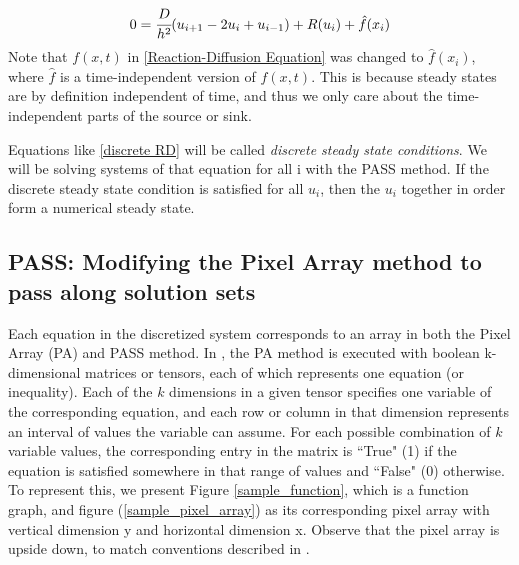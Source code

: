 \documentclass[11pt]{article}
\begin{document}
\begin{equation}
    \label{discrete RD}
    0 = \cfrac{D}{h^2} (u_{i+1} - 2u_i + u_{i-1}) + R(u_i) + \hat{f}(x_i)
\end{equation}
Note that $f(x,t)$ in \cref{Reaction-Diffusion Equation} was changed to $\hat{f}(x_i)$, where $\hat{f}$ is a time-independent version of $f(x,t)$. This is because steady states are by definition independent of time, and thus we only care about the time-independent parts of the source or sink. 

Equations like \eqref{discrete RD} will be called \textit{discrete steady state conditions}. We will be solving systems of that equation for all i with the PASS method. If the discrete steady state condition is satisfied for all $u_i$, then the $u_i$ together in order form a numerical steady state.

\subsection{PASS: Modifying the Pixel Array method to pass along solution sets}\label{sec:PASS}

Each equation in the discretized system corresponds to an array in both the Pixel Array (PA) and PASS method. In \citep{Introduction_to_PA}, the PA method is executed with boolean k-dimensional matrices or tensors, each of which represents one equation (or inequality). Each of the $k$ dimensions in a given tensor specifies one variable of the corresponding equation, and each row or column in that dimension represents an interval of values the variable can assume. For each possible combination of $k$ variable values, the corresponding entry in the matrix is ``True" (1) if the equation is satisfied somewhere in that range of values and ``False" (0) otherwise. To represent this, we present Figure \cref{sample_function}, which is a function graph, and figure (\cref{sample_pixel_array}) as its corresponding pixel array with vertical dimension y and horizontal dimension x. Observe that the pixel array is upside down, to match conventions described in \citep{Introduction_to_PA}.
\end{document}
